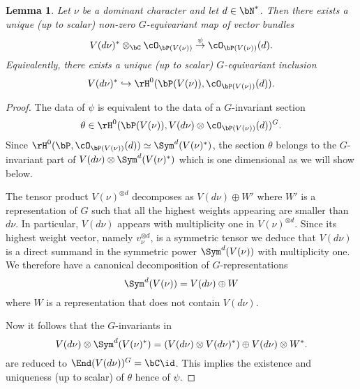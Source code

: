 \documentclass[reqno, 10pt]{amsart}
\theoremstyle{plain}
\newtheorem{lemma}[proposition]{Lemma}
\theoremstyle{definition}
\numberwithin{equation}{section}%
\begin{document}
\begin{lemma}\label{L:constr psi}
	Let $\nu$ be a dominant character and let $d\in\bN^*$.
	Then there exists a unique (up to scalar) non-zero $G$-equivariant map of vector bundles
	\[V(d\nu)^*\otimes_\bC \cO_{\bP(V(\nu))} \stackrel{\psi}\to \cO_{\bP(V(\nu))}(d).\]
	Equivalently, there exists a unique (up to scalar) $G$-equivariant inclusion
\begin{equation}\label{eq:unique Vdnu* inside H0}
		 V(d\nu)^*\hookrightarrow \rH^0(\bP(V(\nu)), \cO_{\bP(V(\nu))}(d)).
\end{equation}
\end{lemma}
\begin{proof}
	The data of $\psi$ is equivalent to the data of a
        $G$-invariant section 
	\[ \theta\in \rH^0(\bP(V(\nu)), V(d\nu)\otimes \cO_{\bP(V(\nu))}(d))^G.\]
	Since $\rH^0(\bP,\cO_{\bP(V(\nu))}(d))\simeq \Sym^d(V(\nu)^*)$,
        the section $\theta$ belongs to the $G$-invariant part of $V(d\nu)\otimes\Sym^d(V(\nu)^*)$ which is one dimensional as we will show below.
	
	\medskip
	
	The tensor product $V(\nu)^{\otimes d}$ decomposes as $V(d\nu)\oplus W'$ where $W'$ is a representation of $G$ such that all the highest weights appearing are smaller than $d\nu$. In particular, $V(d\nu)$ appears with multiplicity one in $V(\nu)^{\otimes d}$.
	Since its highest weight vector, namely $v_\nu^{\otimes d}$, is a symmetric tensor we deduce that $V(d\nu)$ is a direct summand in the symmetric power $\Sym^d(V(\nu))$ with multiplicity one.
	We therefore have a canonical decomposition of $G$-representations
	\[ \Sym^d(V(\nu)) = V(d\nu)\oplus W \]
	where $W$ is a representation that does not contain $V(d\nu)$.
	        

	Now it follows that the $G$-invariants in
	\[ V(d\nu)\otimes \Sym^d(V(\nu)^*) = \left(V(d\nu)\otimes V(d\nu)^*\right) \oplus V(d\nu)\otimes W^*.\]
	are reduced to $\End(V(d\nu))^G=\bC\id$.
	This implies the existence and uniqueness (up to scalar) of $\theta$ hence of $\psi$.

\end{proof}
\end{document}
